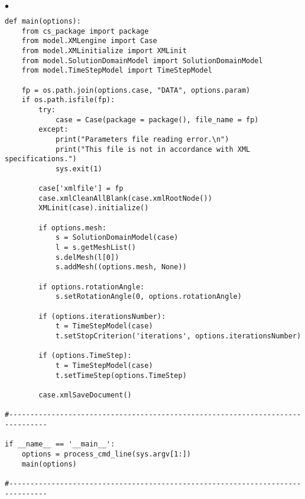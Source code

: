 \documentclass[a4paper,10pt,twoside]{csshortdoc}
\begin{document}
\begin{list}{$\bullet$}{}
\begin{verbatim}
def main(options):
    from cs_package import package
    from model.XMLengine import Case
    from model.XMLinitialize import XMLinit
    from model.SolutionDomainModel import SolutionDomainModel
    from model.TimeStepModel import TimeStepModel

    fp = os.path.join(options.case, "DATA", options.param)
    if os.path.isfile(fp):
        try:
            case = Case(package = package(), file_name = fp)
        except:
            print("Parameters file reading error.\n")
            print("This file is not in accordance with XML specifications.")
            sys.exit(1)

        case['xmlfile'] = fp
        case.xmlCleanAllBlank(case.xmlRootNode())
        XMLinit(case).initialize()

        if options.mesh:
            s = SolutionDomainModel(case)
            l = s.getMeshList()
            s.delMesh(l[0])
            s.addMesh((options.mesh, None))

        if options.rotationAngle:
            s.setRotationAngle(0, options.rotationAngle)

        if (options.iterationsNumber):
            t = TimeStepModel(case)
            t.setStopCriterion('iterations', options.iterationsNumber)

        if (options.TimeStep):
            t = TimeStepModel(case)
            t.setTimeStep(options.TimeStep)

        case.xmlSaveDocument()

#-------------------------------------------------------------------------------

if __name__ == '__main__':
    options = process_cmd_line(sys.argv[1:])
    main(options)

#-------------------------------------------------------------------------------
\end{verbatim}
\normalsize

\end{list}


%
\end{document}
